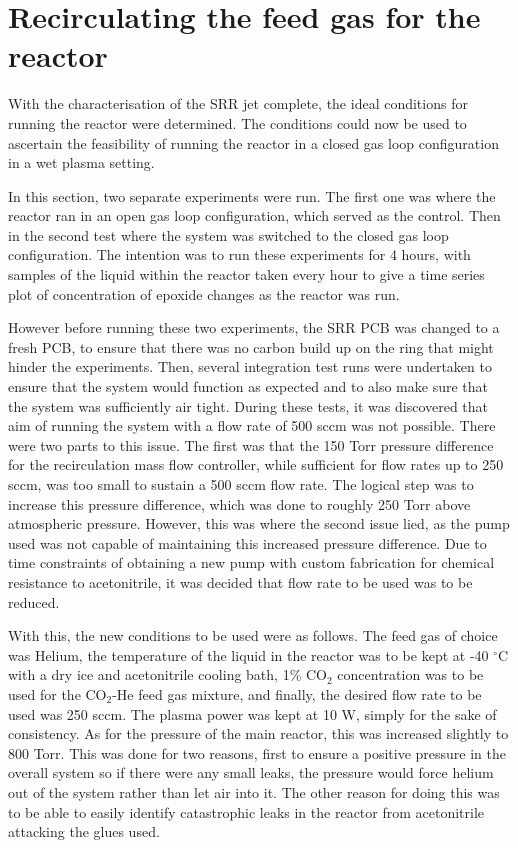 \section{Recirculating the feed gas for the reactor}

With the characterisation of the SRR jet complete, the ideal conditions for running the reactor were determined. The conditions could now be used to ascertain the feasibility of running the reactor in a closed gas loop configuration in a wet plasma setting. 

In this section, two separate experiments were run. The first one was where the reactor ran in an open gas loop configuration, which served as the control. Then in the second test where the system was switched to the closed gas loop configuration. The intention was to run these experiments for 4 hours, with samples of the liquid within the reactor taken every hour to give a time series plot of concentration of epoxide changes as the reactor was run. 

However before running these two experiments, the SRR PCB was changed to a fresh PCB, to ensure that there was no carbon build up on the ring that might hinder the experiments. Then, several integration test runs were undertaken to ensure that the system would function as expected and to also make sure that the system was sufficiently air tight. During these tests, it was discovered that aim of running the system with a flow rate of 500 sccm was not possible. There were two parts to this issue. The first was that the 150 Torr pressure difference for the recirculation mass flow controller, while sufficient for flow rates up to 250 sccm, was too small to sustain a 500 sccm flow rate. The logical step was to increase this pressure difference, which was done to roughly 250 Torr above atmospheric pressure. However, this was where the second issue lied, as the pump used was not capable of maintaining this increased pressure difference. Due to time constraints of obtaining a new pump with custom fabrication for chemical resistance to acetonitrile, it was decided that flow rate to be used was to be reduced. 

With this, the new conditions to be used were as follows. The feed gas of choice was Helium,  the temperature of the liquid in the reactor was to be kept at -40 $^\circ$C with a dry ice and acetonitrile cooling bath, 1\% CO$_2$ concentration was to be used for the CO$_2$-He feed gas mixture, and finally, the desired flow rate to be used was 250 sccm. The plasma power was kept at 10 W, simply for the sake of consistency. As for the pressure of the main reactor, this was increased slightly to 800 Torr. This was done for two reasons, first to ensure a positive pressure in the overall system so if there were any small leaks, the pressure would force helium out of the system rather than let air into it. The other reason for doing this was to be able to easily identify catastrophic leaks in the reactor from acetonitrile attacking the glues used.  

